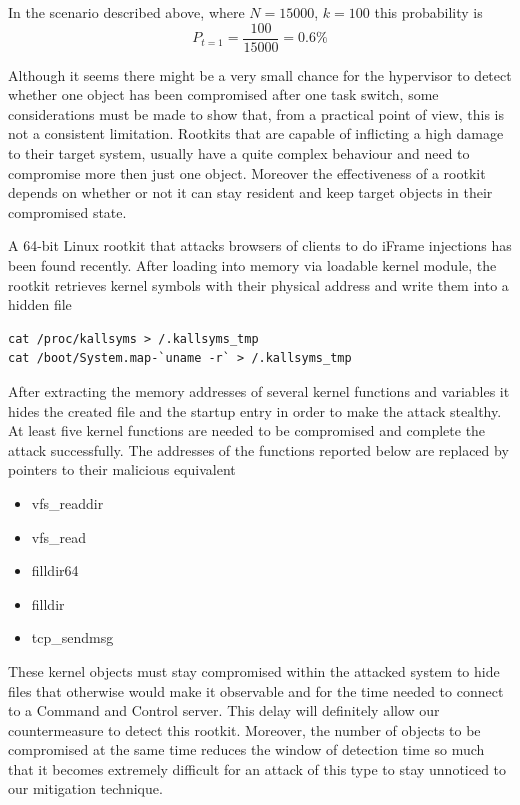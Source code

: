 In the scenario described above, where $N=15000$, $k=100$ this probability is
$$ P_{t=1} = \frac{100}{15000}=0.6\% $$


Although it seems there might be a very small chance for the hypervisor to detect whether one object has been compromised after one task switch, some considerations must be made to show that, from a practical point of view, this is not a consistent limitation.
Rootkits that are capable of inflicting a high damage to their target system, usually have a quite complex behaviour and need to compromise more then just one object. Moreover the effectiveness of a rootkit depends on whether or not it can stay resident and keep target objects in their compromised state.

 
A 64-bit Linux rootkit\cite{rootkit64} that attacks browsers of clients to do iFrame injections has been found recently. After loading into memory via loadable kernel module, the rootkit retrieves kernel symbols with their physical address and write them into a hidden file

\begin{verbatim}
cat /proc/kallsyms > /.kallsyms_tmp 
cat /boot/System.map-`uname -r` > /.kallsyms_tmp
\end{verbatim}

After extracting the memory addresses of several kernel functions and variables it hides the created file and the startup entry in order to make the attack stealthy. At least five kernel functions are needed to be compromised and complete the attack successfully. The addresses of the functions reported below are replaced by pointers to their malicious equivalent \cite{rootkit64,rootkit64anal}

\begin{itemize}
\item vfs\_readdir 
\item vfs\_read 
\item filldir64 
\item filldir
\item tcp\_sendmsg
\end{itemize}

These kernel objects must stay compromised within the attacked system to hide files that otherwise would make it observable and for the time needed to connect to a Command and Control server. 
This delay will definitely allow our countermeasure to detect this rootkit. Moreover, the number of objects to be compromised at the same time reduces the window of detection time so much that it becomes extremely difficult for an attack of this type to stay unnoticed to our mitigation technique.



